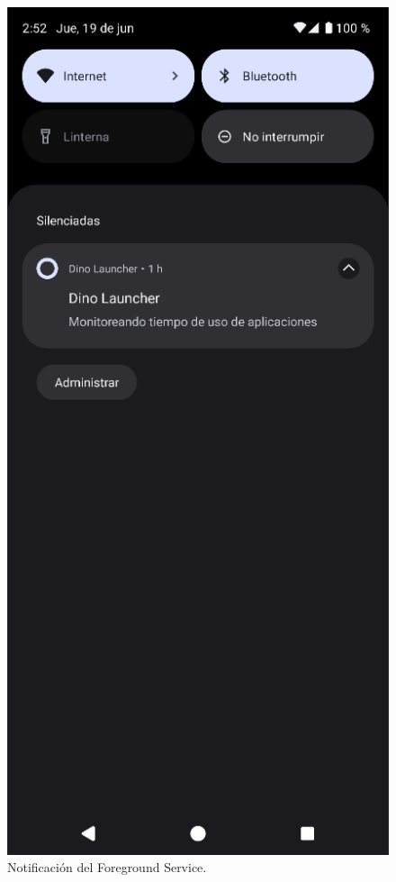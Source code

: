 \begin{figure}[ht!]
\begin{minipage}{0.43\textwidth}
    \centering
  \end{minipage}\hspace{0.05\textwidth}
  \begin{minipage}{0.43\textwidth}
    \caption{Notificación del Foreground Service.}
    \label{fig:foreground_service}
    \centering
    \includegraphics[width=\textwidth]{Figuras/secciones/foreground_service.png}
  \end{minipage}
\end{figure}

